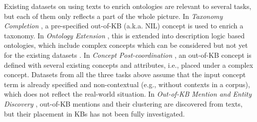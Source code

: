 \documentclass[sigconf]{acmart}
\begin{document}
	Existing datasets on using texts to enrich ontologies are relevant to several tasks, but each of them only reflects a part of the whole picture. In \textit{Taxonomy Completion} \cite{Shen2020TaxoExpan,jurgens-pilehvar-2016-semeval}, a pre-specified out-of-KB (a.k.a. NIL) concept is used to enrich a taxonomy. In \textit{Ontology Extension} \cite{glauer2022interpretable}, this is extended into description logic based ontologies, which include complex concepts which can be considered \cite{chen2023contextual,yuan2023ontolama} but not yet for the existing datasets \cite{glauer2022interpretable}. In \textit{Concept Post-coordination} \cite{kate2020,castell2023postcoordination}, an out-of-KB concept is defined with several existing concepts and attributes, i.e., placed under a complex concept. Datasets from all the three tasks above assume that the input concept term is already specified and non-contextual (e.g., without contexts in a corpus), which does not reflect the real-world situation. In \textit{Out-of-KB Mention and Entity Discovery} \cite{Iurshina2022nilk,heist2023nastylinker,dong2023NIL}, out-of-KB mentions and their clustering are discovered from texts, but their placement in KBs has not been fully investigated.
\end{document}
